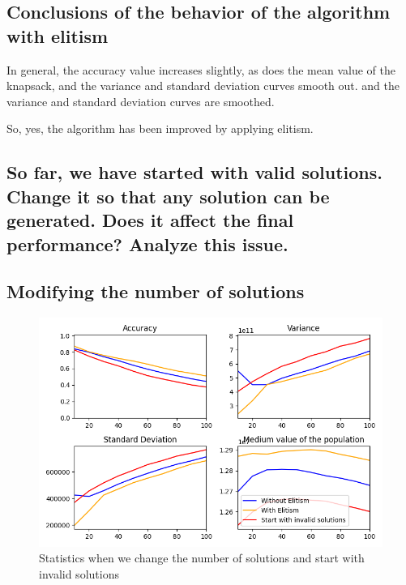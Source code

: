 \documentclass{article}
\begin{document}
    \subsection{Conclusions of the behavior of the algorithm with elitism}

    In general, the accuracy value increases slightly, as does the mean value of the knapsack, and the variance and standard deviation curves smooth out.
    and the variance and standard deviation curves are smoothed.
    
    So, yes, the algorithm has been improved by applying elitism.

    \subsection{So far, we have started with valid solutions. Change it so that any solution can be
    generated. Does it affect the final performance? Analyze this issue.}


    \subsection*{Modifying the number of solutions}

    \begin{figure}[H]

        \centering
        \includegraphics[width=1\textwidth]{../media/ej1/01.NSolutions_withInvSols_behaviour.png}
        \caption{Statistics when we change the number of solutions and start with invalid solutions}
        \label{Statistics when we change the number of solutions and start with invalid solutions}

    \end{figure}
\end{document}
